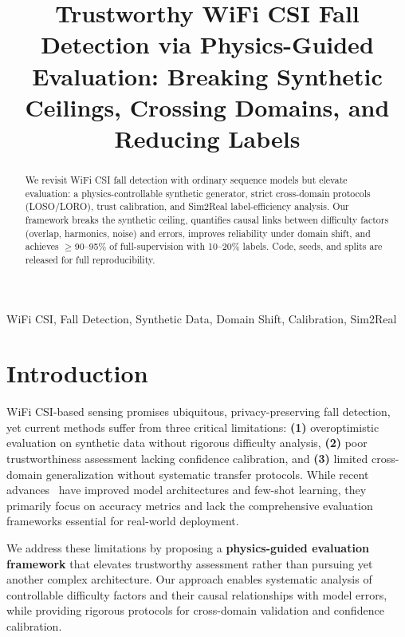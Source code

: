 \documentclass[10pt,conference]{IEEEtran}
\begin{document}
\title{Trustworthy WiFi CSI Fall Detection via Physics-Guided Evaluation: Breaking Synthetic Ceilings, Crossing Domains, and Reducing Labels}

\author{
}

\maketitle

\begin{abstract}
We revisit WiFi CSI fall detection with ordinary sequence models but elevate evaluation: a physics-controllable synthetic generator, strict cross-domain protocols (LOSO/LORO), trust calibration, and Sim2Real label-efficiency analysis. Our framework breaks the synthetic ceiling, quantifies causal links between difficulty factors (overlap, harmonics, noise) and errors, improves reliability under domain shift, and achieves $\geq$90--95\% of full-supervision with 10--20\% labels. Code, seeds, and splits are released for full reproducibility.
\end{abstract}

\begin{IEEEkeywords}
WiFi CSI, Fall Detection, Synthetic Data, Domain Shift, Calibration, Sim2Real
\end{IEEEkeywords}

\section{Introduction}
WiFi CSI-based sensing promises ubiquitous, privacy-preserving fall detection, yet current methods suffer from three critical limitations: \textbf{(1)} overoptimistic evaluation on synthetic data without rigorous difficulty analysis, \textbf{(2)} poor trustworthiness assessment lacking confidence calibration, and \textbf{(3)} limited cross-domain generalization without systematic transfer protocols. While recent advances~\cite{rewis2022, autofi2022, fewsense2022} have improved model architectures and few-shot learning, they primarily focus on accuracy metrics and lack the comprehensive evaluation frameworks essential for real-world deployment.

We address these limitations by proposing a \textbf{physics-guided evaluation framework} that elevates trustworthy assessment rather than pursuing yet another complex architecture. Our approach enables systematic analysis of controllable difficulty factors and their causal relationships with model errors, while providing rigorous protocols for cross-domain validation and confidence calibration.
\end{document}
